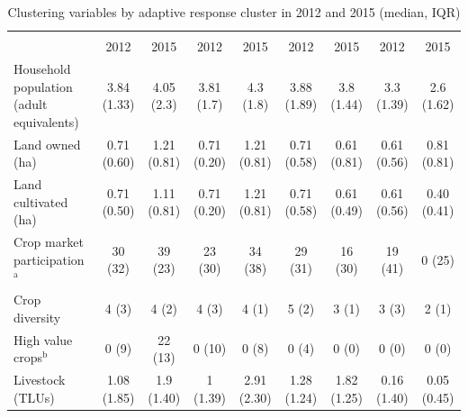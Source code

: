 \begin{table}
  \captionsetup{singlelinecheck = false, justification=justified} %
  \caption{
  Clustering variables by adaptive response cluster in 2012 and 2015 (median, IQR)
  }
  \label{tab:04_2}
  \small
\begin{tabular}{L{3.8cm}cccccccc}
\toprule
 &  &  &  &  \\
 & 2012 & 2015 & 2012 & 2015 & 2012 & 2015 & 2012 & 2015  \\
 \midrule
Household population (adult equivalents) & 3.84 (1.33) & 4.05 (2.3) & 3.81 (1.7) & 4.3 (1.8) & 3.88 (1.89) & 3.8 (1.44) & 3.3 (1.39) & 2.6 (1.62)  \\
Land owned (ha) & 0.71 (0.60) & 1.21 (0.81) & 0.71 (0.20) & 1.21 (0.81) & 0.71 (0.58) & 0.61 (0.81) & 0.61 (0.56) & 0.81 (0.81)  \\
Land cultivated (ha) & 0.71 (0.50) & 1.11 (0.81) & 0.71 (0.20) & 1.21 (0.81) & 0.71 (0.58) & 0.61 (0.49) & 0.61 (0.56) & 0.40 (0.41)  \\
Crop market participation$^{\mathrm{a}}$ & 30 (32) & 39 (23) & 23 (30) & 34 (38) & 29 (31) & 16 (30) & 19 (41) & 0 (25) \\
Crop diversity & 4 (3) & 4 (2) & 4 (3) & 4 (1) & 5 (2) & 3 (1) & 3 (3) & 2 (1)  \\
High value crops$^{\mathrm{b}}$ & 0 (9) & 22 (13) & 0 (10) & 0 (8) & 0 (4) & 0 (0) & 0 (0) & 0 (0)  \\
Livestock (TLUs) & 1.08 (1.85) & 1.9 (1.40) & 1 (1.39) & 2.91 (2.30) & 1.28 (1.24) & 1.82 (1.25) & 0.16 (1.40) & 0.05 (0.45) \\

\end{tabular}
\end{table}
